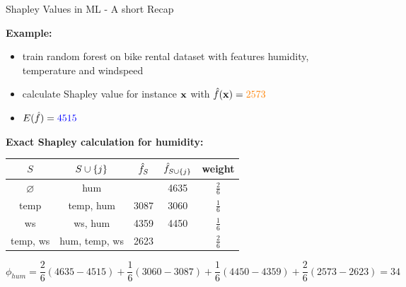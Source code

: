 \documentclass[11pt,compress,t,notes=noshow, aspectratio=169, xcolor=table]{beamer}
\begin{document}
\begin{vbframe}{Shapley Values in ML - A short Recap}
  
  \textbf{Example:} 
  \begin{itemize}
      \item train random forest on bike rental dataset with features humidity, temperature and windspeed
      \item calculate Shapley value for instance $\xv$ with $\fh(\xv) = \color{orange}{2573}$
      \item $E(\fh) = \color{blue}{4515}$
  \end{itemize}
  \textbf{Exact Shapley calculation for humidity:} 
  \begin{table}[T]
      \centering
      \begin{tabular}{c|c|c|c|c}
   $S$    &  $\Scupj$  & $\fh_S$ &  $\fh_{\Scupj}$  & weight\\\hline
     $\varnothing$&    hum  & \color{blue}{4515} & 4635 & $\frac{2}{6}$\\
       temp &  temp, hum & 3087 & 3060& $\frac{1}{6}$\\
       ws &  ws, hum & 4359  & 4450 & $\frac{1}{6}$\\
       temp, ws &  hum, temp, ws & 2623 & \color{orange}{2573} & $\frac{2}{6}$
         
      \end{tabular}
      \label{tab:my_label}
  \end{table}

$$
\phi_{hum} = \frac{2}{6} (4635-4515) + \frac{1}{6} (3060-3087) + \frac{1}{6} (4450-4359) + \frac{2}{6} (2573-2623) = 34
$$

\end{vbframe}
\end{document}
